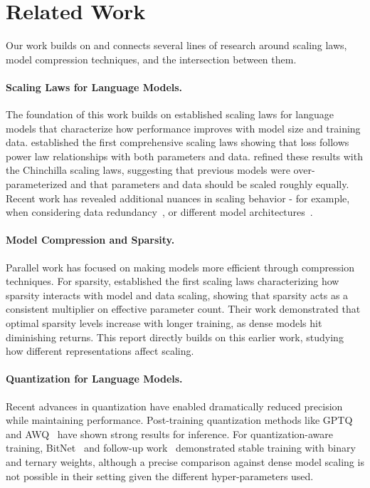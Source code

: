\section{Related Work}
\label{sec:related-work}

Our work builds on and connects several lines of research around scaling laws, model compression techniques, and the intersection between them.

\paragraph{Scaling Laws for Language Models.} The foundation of this work builds on established scaling laws for language models that characterize how performance improves with model size and training data. \citet{kaplan2020scalinglawsneurallanguage} established the first comprehensive scaling laws showing that loss follows power law relationships with both parameters and data. \citet{hoffmann2022trainingcomputeoptimallargelanguage} refined these results with the Chinchilla scaling laws, suggesting that previous models were over-parameterized and that parameters and data should be scaled roughly equally. Recent work has revealed additional nuances in scaling behavior - for example, when considering data redundancy~\citep{muennighoff2023scaling}, or different model architectures~\citep{clark2022unified}.

\paragraph{Model Compression and Sparsity.} Parallel work has focused on making models more efficient through compression techniques. For sparsity, \citet{frantar2023scalinglawssparselyconnectedfoundation} established the first scaling laws characterizing how sparsity interacts with model and data scaling, showing that sparsity acts as a consistent multiplier on effective parameter count. Their work demonstrated that optimal sparsity levels increase with longer training, as dense models hit diminishing returns. This report directly builds on this earlier work, studying how different representations affect scaling. 

\paragraph{Quantization for Language Models.} 
Recent advances in quantization have enabled dramatically reduced precision while maintaining performance. Post-training quantization methods like GPTQ~\citep{frantar2022gptq} and AWQ~\citep{lin2023awq} have shown strong results for inference. For quantization-aware training, BitNet~\citep{wang2023bitnet} and  follow-up work~\citep{ma2024era1bitllmslarge, kaushal2024spectra} demonstrated stable training with binary and ternary weights, although a precise comparison against dense model scaling is not possible in their setting given the different hyper-parameters used. 

